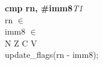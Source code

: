 


\begin{instructionblock}{\imagewidth}%
    \textbf{cmp rn, \#imm8}\hfill\textit{T1}\\
    rn $\in$ \baseregisters\\
    imm8 $\in$ \immEight\\
    {N Z C V}\\
    update\_flags(rn - imm8);
\end{instructionblock}

